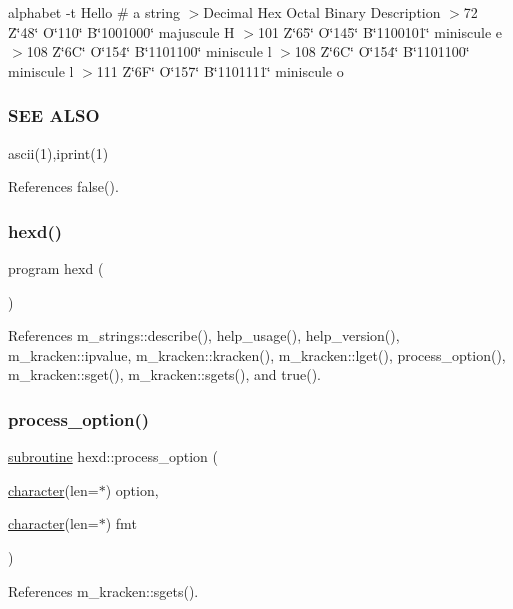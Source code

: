 alphabet -\/t Hello \# a string $>$Decimal Hex Octal Binary Description $>$72 Z\char`\"{}48\char`\"{} O\char`\"{}110\char`\"{} B\char`\"{}1001000\char`\"{} majuscule H $>$101 Z\char`\"{}65\char`\"{} O\char`\"{}145\char`\"{} B\char`\"{}1100101\char`\"{} miniscule e $>$108 Z\char`\"{}6\+C\char`\"{} O\char`\"{}154\char`\"{} B\char`\"{}1101100\char`\"{} miniscule l $>$108 Z\char`\"{}6\+C\char`\"{} O\char`\"{}154\char`\"{} B\char`\"{}1101100\char`\"{} miniscule l $>$111 Z\char`\"{}6\+F\char`\"{} O\char`\"{}157\char`\"{} B\char`\"{}1101111\char`\"{} miniscule o

\subsubsection*{S\+EE A\+L\+SO}

ascii(1),iprint(1) 

References false().

\mbox{\label{alphabet_8f90_aa1b7d174dbbe1ca1d92bf00b80724012}} 
\subsubsection{\texorpdfstring{hexd()}{hexd()}}
{\footnotesize\ttfamily program hexd (\begin{DoxyParamCaption}{ }\end{DoxyParamCaption})}



References m\+\_\+strings\+::describe(), help\+\_\+usage(), help\+\_\+version(), m\+\_\+kracken\+::ipvalue, m\+\_\+kracken\+::kracken(), m\+\_\+kracken\+::lget(), process\+\_\+option(), m\+\_\+kracken\+::sget(), m\+\_\+kracken\+::sgets(), and true().

\mbox{\label{alphabet_8f90_a697200725bfc294a3efd62fcb58b7255}} 
\subsubsection{\texorpdfstring{process\+\_\+option()}{process\_option()}}
{\footnotesize\ttfamily \hyperlink{M__stopwatch_83_8txt_acfbcff50169d691ff02d4a123ed70482}{subroutine} hexd\+::process\+\_\+option (\begin{DoxyParamCaption}\item[{\hyperlink{option__stopwatch_83_8txt_abd4b21fbbd175834027b5224bfe97e66}{character}(len=$\ast$)}]{option,  }\item[{\hyperlink{option__stopwatch_83_8txt_abd4b21fbbd175834027b5224bfe97e66}{character}(len=$\ast$)}]{fmt }\end{DoxyParamCaption})}



References m\+\_\+kracken\+::sgets().

